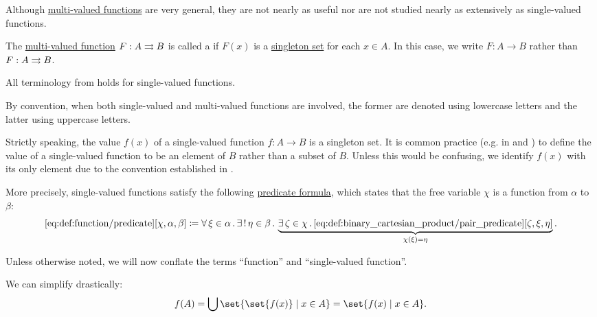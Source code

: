 \begin{definition}\label{def:function}
  Although \hyperref[def:multi_valued_function]{multi-valued functions} are very general, they are not nearly as useful nor are not studied nearly as extensively as single-valued functions.

  The \hyperref[def:multi_valued_function]{multi-valued function} \( F: A \rightrightarrows B \) is called a  if \( F(x) \) is a \hyperref[rem:singleton_sets]{singleton set} for each \( x \in A \). In this case, we write \( F: A \to B \) rather than \( F: A \rightrightarrows B \).

  All terminology from  holds for single-valued functions.

  By convention, when both single-valued and multi-valued functions are involved, the former are denoted using lowercase letters and the latter using uppercase letters.

  Strictly speaking, the value \( f(x) \) of a single-valued function \( f: A \to B \) is a singleton set. It is common practice (e.g. in \cite[def. 3.1]{OpenLogicFull} and \cite[10]{Kelley1955}) to define the value of a single-valued function to be an element of \( B \) rather than a subset of \( B \). Unless this would be confusing, we identify \( f(x) \) with its only element due to the convention established in .

  More precisely, single-valued functions satisfy the following \hyperref[rem:predicate_formula]{predicate formula}, which states that the free variable \( \chi \) is a function from \( \alpha \) to \( \beta \):
  \begin{equation*}\taglabel[\op{IsFun}]{eq:def:function/predicate}
    \ref{eq:def:function/predicate}[\chi, \alpha, \beta] \coloneqq \qforall {\xi \in \alpha} \qExists {\eta \in \beta} \underbrace{ \qexists {\zeta \in \chi} \ref{eq:def:binary_cartesian_product/pair_predicate}[\zeta, \xi, \eta] }_{\chi(\xi) = \eta}.
  \end{equation*}

  Unless otherwise noted, we will now conflate the terms \enquote{function} and \enquote{single-valued function}.

  \begin{thmenum}
     We can simplify  drastically:
    \begin{equation*}
      f(A)
      =
      \bigcup \set{ \set{ f(x) } \given x \in A }
      =
      \set{ f(x) \given x \in A }.
    \end{equation*}


\end{thmenum}
\end{definition}
